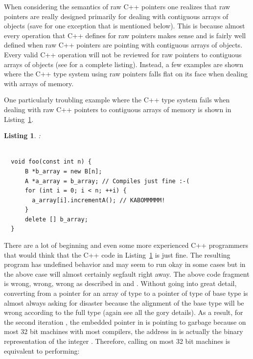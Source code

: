 \documentclass[pdf,ps2pdf,11pt]{SANDreport}
\newtheorem{listing}{Listing}
\begin{document}
When considering the semantics of raw C++ pointers one realizes that
raw pointers are really designed primarily for dealing with contiguous
arrays of objects (save for one exception that is mentioned below).
This is because almost every operation that C++ defines for raw
pointers makes sense and is fairly well defined when raw C++ pointers
are pointing with contiguous arrays of objects.  Every valid C++
operation will not be reviewed for raw pointers to contiguous arrays
of objects (see {}\cite{stroustrup97} for a complete listing).
Instead, a few examples are shown where the C++ type system using raw
pointers falls flat on its face when dealing with arrays of memory.

One particularly troubling example where the C++ type system fails
when dealing with raw C++ pointers to contiguous arrays of memory is
shown in Listing~\ref{listing:BadArrayPointerConversion}.

\begin{listing}:\\
\label{listing:BadArrayPointerConversion}
{\small\begin{verbatim}

  void foo(const int n) {
      B *b_array = new B[n];
      A *a_array = b_array; // Compiles just fine :-(
      for (int i = 0; i < n; ++i) {
        a_array[i].incrementA(); // KABOMMMMM!
      }
      delete [] b_array;
  }

\end{verbatim}}
\end{listing}

There are a lot of beginning and even some more experienced C++
programmers that would think that the C++ code in
Listing~\ref{listing:BadArrayPointerConversion} is just fine.  The
resulting program has undefined behavior and may seem to run okay in
some cases but in the above case will almost certainly segfault right
away.  The above code fragment is wrong, wrong, wrong as described in
{}\cite[Gotcha 33]{C++Gotchas03} and {}\cite[Item
100]{C++CodingStandards05}.  Without going into great detail,
converting from a pointer for an array of type {} to a pointer
of type of base type {} is almost always asking for disaster
because the alignment of the base type {} will be wrong
according to the full type {} (again see {}\cite[Gotcha
33]{C++Gotchas03} all the gory details).  As a result, for the second
iteration {}, the embedded pointer in
{} is pointing to garbage because on most
32 bit machines with most compilers, the address in
{} is actually the binary representation
of the integer {}.  Therefore, calling
{} on most 32 bit machines is
equivalent to performing:
\end{document}
